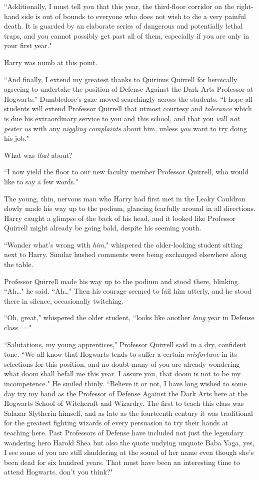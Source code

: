 ``Additionally, I must tell you that this year, the third-floor corridor on the right-hand side is out of bounds to everyone who does not wish to die a very painful death. It is guarded by an elaborate series of dangerous and potentially lethal traps, and you cannot possibly get past all of them, especially if you are only in your first year."

Harry was numb at this point.

``And finally, I extend my greatest thanks to Quirinus Quirrell for heroically agreeing to undertake the position of Defense Against the Dark Arts Professor at Hogwarts." Dumbledore's gaze moved searchingly across the students. ``I hope all students will extend Professor Quirrell that utmost courtesy and \emph{tolerance} which is due his extraordinary service to you and this school, and that you \emph{will not pester us} with any \emph{niggling complaints} about him, unless \emph{you} want to try doing his job."

What was \emph{that} about?

``I now yield the floor to our new faculty member Professor Quirrell, who would like to say a few words."

The young, thin, nervous man who Harry had first met in the Leaky Cauldron slowly made his way up to the podium, glancing fearfully around in all directions. Harry caught a glimpse of the back of his head, and it looked like Professor Quirrell might already be going bald, despite his seeming youth.

``Wonder what's wrong with \emph{him}," whispered the older-looking student sitting next to Harry. Similar hushed comments were being exchanged elsewhere along the table.

Professor Quirrell made his way up to the podium and stood there, blinking. ``Ah{\ldots}" he said. ``Ah{\ldots}" Then his courage seemed to fail him utterly, and he stood there in silence, occasionally twitching.

``Oh, great," whispered the older student, ``looks like another \emph{long} year in Defense class\==="

``Salutations, my young apprentices," Professor Quirrell said in a dry, confident tone. ``We all know that Hogwarts tends to suffer a certain \emph{misfortune} in its selections for this position, and no doubt many of you are already wondering what doom shall befall me this year. I assure you, that doom is not to be my incompetence." He smiled thinly. ``Believe it or not, I have long wished to some day try my hand as the Professor of Defense Against the Dark Arts here at the Hogwarts School of Witchcraft and Wizardry. The first to teach this class was Salazar Slytherin himself, and as late as the fourteenth century it was traditional for the greatest fighting wizards of every persuasion to try their hands at teaching here. Past Professors of Defense have included not just the legendary wandering hero Harold Shea but also the quote undying unquote Baba Yaga, yes, I see some of you are still shuddering at the sound of her name even though she's been dead for six hundred years. That must have been an interesting time to attend Hogwarts, don't you think?"

